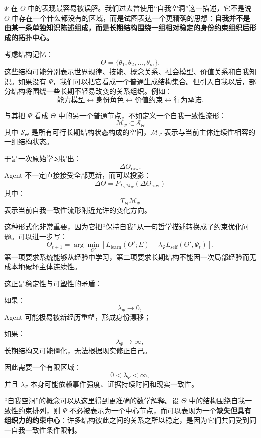 $\Psi$ 在 $\Theta$ 中的表现最容易被误解。我们过去曾使用“自我空洞”这一描述，它不是说 $\Theta$ 中存在一个什么都没有的区域，而是试图表达一个更精确的思想：\textbf{自我并不是由某一条单独知识陈述组成，而是长期结构围绕一组相对稳定的身份约束组织后形成的拓扑中心。}

考虑结构记忆：
\[
\Theta
=
\{\theta_1,\theta_2,\ldots,\theta_m\}.
\]
这些结构可能分别表示世界规律、技能、概念关系、社会模型、价值关系和自我知识。如果没有 $\Psi$，我们可以把它看成一个普通生成结构集合。但引入自我以后，部分结构将围绕一些长期不轻易改变的关系组织。例如：
\[
\text{能力模型}
\leftrightarrow
\text{身份角色}
\leftrightarrow
\text{价值约束}
\leftrightarrow
\text{行为承诺}.
\]

与其把 $\Psi$ 看成 $\Theta$ 中的另一个普通节点，不如定义一个自我一致性流形：
\[
\boxed{
\mathcal M_\Psi
\subset
\mathcal S_\Theta
}
\]
其中 $\mathcal S_\Theta$ 是所有可行长期结构状态构成的空间，$\mathcal M_\Psi$ 表示与当前主体连续性相容的一组结构状态。

于是一次原始学习提出：
\[
\Delta\Theta_{\mathrm{raw}}.
\]
Agent 不一定直接接受全部更新，而可以投影：
\[
\boxed{
\Delta\Theta
=
P_{T_\Theta\mathcal M_\Psi}
\left(
\Delta\Theta_{\mathrm{raw}}
\right)
}
\]
其中：
\[
T_\Theta\mathcal M_\Psi
\]
表示当前自我一致性流形附近允许的变化方向。

这种形式化非常重要，因为它把“保持自我”从一句哲学描述转换成了约束优化问题。可以进一步写：
\[
\Theta_{t+1}
=
\arg\min_{\Theta'}
\left[
L_{\mathrm{learn}}(\Theta';E)
+
\lambda_\Psi
L_{\mathrm{self}}
(\Theta',\Psi_t)
\right].
\]
第一项要求系统能够从经验中学习，第二项要求长期结构不能因一次局部经验而无成本地破坏主体连续性。

这正是稳定性与可塑性的矛盾：
\begin{statementbox}
\centering
{}
\end{statementbox}
如果：
\[
\lambda_\Psi\rightarrow 0,
\]
Agent 可能极易被新经历重塑，形成身份漂移；

如果：
\[
\lambda_\Psi\rightarrow\infty,
\]
长期结构又可能僵化，无法根据现实修正自己。

因此需要一个有限区域：
\[
0<\lambda_\Psi<\infty,
\]
并且 $\lambda_\Psi$ 本身可能依赖事件强度、证据持续时间和现实一致性。

“自我空洞”的概念可以从这里得到更准确的数学解释。设 $\Theta$ 中的结构围绕自我一致性约束排列，则 $\Psi$ 不必被表示为一个中心节点，而可以表现为一个\textbf{缺失但具有组织力的约束中心}：许多结构彼此之间的关系之所以稳定，是因为它们共同受到同一自我一致性条件限制。

